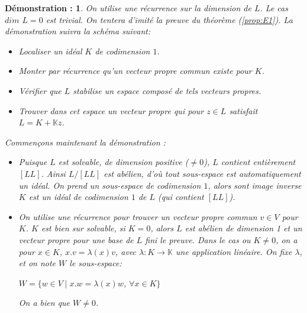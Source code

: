 \documentclass[a4paper,openany,12pt]{report}
\newcommand{\KK}{\mathbb{K}}
\theoremstyle{break}
{\theorembodyfont{\upshape}
\newtheorem*{rmq}{Remarque :}
\newtheorem*{prv}{Preuve :}
\newtheorem*{ex}{Exemples :}
\newtheorem{exe}{Exemple : }
\newtheorem*{nota}{Notation :}}
\newtheorem*{dem}{D\'emonstration :}
\begin{document}
\begin{dem}
\quad On utilise une récurrence sur la dimension de $L$. 
Le cas $dim$ $L=0$ est trivial. 
On tentera d'imité la preuve du théorème (\ref{prop:E1}). La démonstration suivra la schéma suivant:
\begin{itemize}
\item[(1)] Localiser un idéal $K$ de codimension $1$.
\item[(2)] Monter par récurrence qu'un vecteur propre commun existe pour $K$.
\item[(3)] Vérifier que $L$ stabilise un espace composé de tels vecteurs propres.
\item[(4)] Trouver dans cet espace un vecteur propre qui pour $z \in L$ satisfait $L=K+\KK z$.
\end{itemize}
Commençons maintenant la démonstration :
\begin{itemize}
\item[(1)] Puisque $L$ est solvable, de dimension positive ($\neq  0$), $L$ contient entièrement $[LL]$. Ainsi $L/[LL]$ est abélien, d'où tout sous-espace est automatiquement un idéal. On prend un sous-espace de codimension $1$, alors sont image inverse $K$ est un idéal de codimension $1$ de $L$ (qui contient $[LL]$).

\item[(2)] On utilise une récurrence pour trouver un vecteur propre commun $v \in V$ pour $K$. $K$ est bien sur solvable, si $K=0$, alors $L$ est abélien de dimension 1 et un vecteur propre pour une base de $L$ fini le preuve. Dans le cas ou $K \neq 0$, on a pour $x \in K$, $x.v= \lambda(x)v$, avec $\lambda : K \to \KK$ une application linéaire. On fixe $\lambda$, et on note $W$ le sous-espace:
\begin{center}
$W=\{ w \in V \mid x.w= \lambda(x)w$, $\forall x \in K \} $
\end{center}
On a bien que $W \neq 0$.


\end{itemize}
\end{dem}
\end{document}
